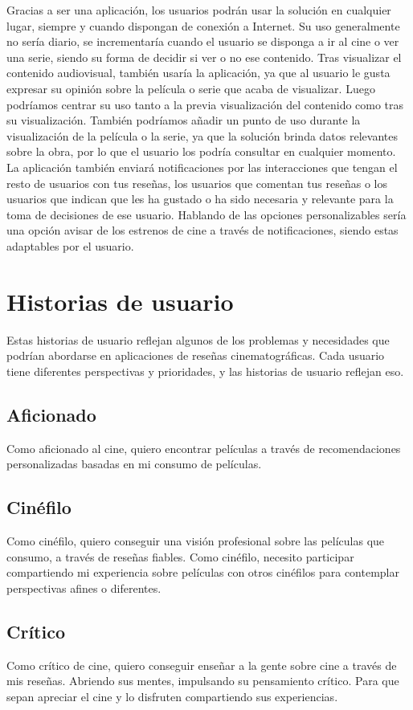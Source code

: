 Gracias a ser una aplicación, los usuarios podrán usar la solución en cualquier lugar, siempre y 
cuando dispongan de conexión a Internet. Su uso generalmente no sería diario, se incrementaría cuando 
el usuario se disponga a ir al cine o ver una serie, siendo su forma de decidir si ver o no ese 
contenido. Tras visualizar el contenido audiovisual, también usaría la aplicación, ya que al usuario le 
gusta expresar su opinión sobre la película o serie que acaba de visualizar. Luego podríamos centrar su 
uso tanto a la previa visualización del contenido como tras su visualización. También podríamos añadir 
un punto de uso durante la visualización de la película o la serie, ya que la solución brinda datos 
relevantes sobre la obra, por lo que el usuario los podría consultar en cualquier momento. La 
aplicación también enviará notificaciones por las interacciones que tengan el resto de usuarios con tus 
reseñas, los usuarios que comentan tus reseñas o los usuarios que indican que les ha gustado o ha sido 
necesaria y relevante para la toma de decisiones de ese usuario. Hablando de las opciones 
personalizables sería una opción avisar de los estrenos de cine a través de notificaciones, 
siendo estas adaptables por el usuario.



\section{Historias de usuario}


Estas historias de usuario reflejan algunos de los problemas y necesidades que podrían abordarse en aplicaciones de reseñas cinematográficas. Cada usuario tiene diferentes perspectivas y prioridades, y las historias de usuario reflejan eso.

\subsection{Aficionado}

Como aficionado al cine, quiero encontrar películas a través de recomendaciones personalizadas basadas en mi consumo de películas.

\subsection{Cinéfilo}

Como cinéfilo, quiero conseguir una visión profesional sobre las películas que consumo, a través de reseñas fiables. Como cinéfilo, necesito participar compartiendo mi experiencia sobre películas con otros cinéfilos para contemplar perspectivas afines o diferentes. 

\subsection{Crítico}

Como crítico de cine, quiero conseguir enseñar a la gente sobre cine a través de mis reseñas. Abriendo sus mentes, impulsando su pensamiento crítico. Para que sepan apreciar el cine y lo disfruten compartiendo sus experiencias.
